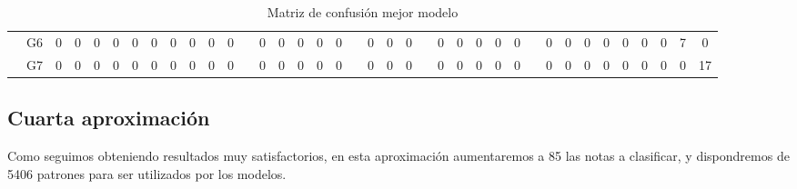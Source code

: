 \documentclass[12pt]{article}
\begin{document}
\begin{table}[!ht]
{\begin{tabular}{cccccccccccccccccccccccccccccccccccccc}
\multicolumn{1}{c|}{}                       & \multicolumn{1}{c|}{G6}  & \multicolumn{1}{c|}{0}  & \multicolumn{1}{c|}{0}  & \multicolumn{1}{c|}{0}  & \multicolumn{1}{c|}{0}  & \multicolumn{1}{c|}{0}  & \multicolumn{1}{c|}{0}  & \multicolumn{1}{c|}{0}  & \multicolumn{1}{c|}{0}  & \multicolumn{1}{c|}{0}  & \multicolumn{1}{c|}{0}  & \multicolumn{1}{c|}{}                     & \multicolumn{1}{c|}{0}  & \multicolumn{1}{c|}{0}  & \multicolumn{1}{c|}{0}  & \multicolumn{1}{c|}{0}  & \multicolumn{1}{c|}{0}  & \multicolumn{1}{c|}{}                     & \multicolumn{1}{c|}{0}  & \multicolumn{1}{c|}{0}  & \multicolumn{1}{c|}{0}  & \multicolumn{1}{c|}{}                     & \multicolumn{1}{c|}{0}  & \multicolumn{1}{c|}{0}  & \multicolumn{1}{c|}{0}  & \multicolumn{1}{c|}{0}  & \multicolumn{1}{c|}{0}  & \multicolumn{1}{c|}{}                     & \multicolumn{1}{c|}{0}  & \multicolumn{1}{c|}{0}  & \multicolumn{1}{c|}{0}  & \multicolumn{1}{c|}{0}  & \multicolumn{1}{c|}{0}  & \multicolumn{1}{c|}{0}  & \multicolumn{1}{c|}{0}  & \multicolumn{1}{c|}{7}  & \multicolumn{1}{c|}{0}  \\ \cline{2-12} \cline{14-18} \cline{20-22} \cline{24-28} \cline{30-38} 
\multicolumn{1}{c|}{}                       & \multicolumn{1}{c|}{G7}  & \multicolumn{1}{c|}{0}  & \multicolumn{1}{c|}{0}  & \multicolumn{1}{c|}{0}  & \multicolumn{1}{c|}{0}  & \multicolumn{1}{c|}{0}  & \multicolumn{1}{c|}{0}  & \multicolumn{1}{c|}{0}  & \multicolumn{1}{c|}{0}  & \multicolumn{1}{c|}{0}  & \multicolumn{1}{c|}{0}  & \multicolumn{1}{c|}{}                     & \multicolumn{1}{c|}{0}  & \multicolumn{1}{c|}{0}  & \multicolumn{1}{c|}{0}  & \multicolumn{1}{c|}{0}  & \multicolumn{1}{c|}{0}  & \multicolumn{1}{c|}{}                     & \multicolumn{1}{c|}{0}  & \multicolumn{1}{c|}{0}  & \multicolumn{1}{c|}{0}  & \multicolumn{1}{c|}{}                     & \multicolumn{1}{c|}{0}  & \multicolumn{1}{c|}{0}  & \multicolumn{1}{c|}{0}  & \multicolumn{1}{c|}{0}  & \multicolumn{1}{c|}{0}  & \multicolumn{1}{c|}{}                     & \multicolumn{1}{c|}{0}  & \multicolumn{1}{c|}{0}  & \multicolumn{1}{c|}{0}  & \multicolumn{1}{c|}{0}  & \multicolumn{1}{c|}{0}  & \multicolumn{1}{c|}{0}  & \multicolumn{1}{c|}{0}  & \multicolumn{1}{c|}{0}  & \multicolumn{1}{c|}{17} \\ \cline{2-38} 
		\end{tabular}
	}
	\caption{Matriz de confusión mejor modelo }
	\label{tab:confusion_matrix_3}
\end{table}

\newpage
\subsection{Cuarta aproximación}
\label{Cuarta aproximación}
Como seguimos obteniendo resultados muy satisfactorios, en esta aproximación aumentaremos a 85 las notas a clasificar, y dispondremos de 
5406 patrones para ser utilizados por los modelos. 
\end{document}
